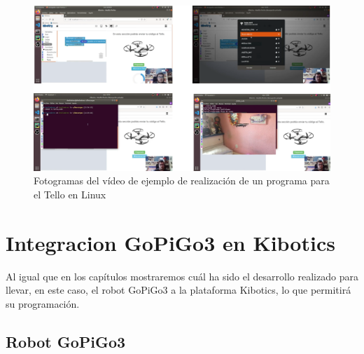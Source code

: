 \documentclass{report}
\begin{document}
\begin{figure}[h!]
  \centering
    \includegraphics[width=1\textwidth]{images/fotogramas_tello.png}
  \caption{Fotogramas del vídeo de ejemplo de realización de un programa para el Tello en Linux}
  \label{Fotogramas del vídeo de ejemplo de realización de un programa para el Tello en Linux}
\end{figure}



\chapter{Integracion GoPiGo3 en Kibotics}

Al igual que en los capítulos mostraremos cuál ha sido el desarrollo realizado para llevar, en este caso, el robot GoPiGo3 a la plataforma Kibotics, lo que permitirá su programación.

\section{Robot GoPiGo3}
\end{document}
